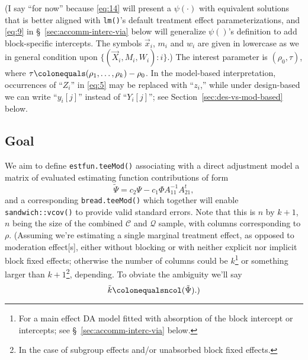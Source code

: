 \documentclass{article}
\newcommand{\defeq}{\ensuremath{\colonequals}}
\begin{document}
(I say ``for now'' because \eqref{eq:14} will present a
$\psi(\cdot)$ with equivalent solutions that is better aligned with
\texttt{lm()}'s default treatment effect parameterizations, and
\eqref{eq:9} in \S~\ref{sec:accomm-interc-via} below will generalize $\psi()$'s definition
to add block-specific intercepts.  The symbols $\vec{x}_{i}$, $m_{i}$
and $w_{i}$ are given in lowercase as we in general condition upon
$\{(\vec{X}_{i}, M_{i}, W_{i}): i\}$.)
The interest parameter is $(\rho_{0}, \tau)$, where $\tau \defeq (\rho_{1}, \ldots, \rho_{k}) - \rho_{0}$. In the model-based interpretation, occurrences of ``$Z_{i}$'' in \eqref{eq:5} may be replaced with ``$z_{i}$,'' while under design-based we can write ``$y_{i}[j]$'' instead of ``$Y_{i}[j]$''; see Section~\ref{sec:des-vs-mod-based} below.

\subsection{Goal} \label{sec:goal}
We aim to define \texttt{estfun.teeMod()} associating
with a direct adjustment model a matrix of evaluated estimating function
contributions of form
\begin{equation} \label{eq:22}
  \tilde{\Psi} = c_{2}\Psi - c_{1}\Phi A_{11}^{-1}A_{21}^{t},
\end{equation}
and a corresponding \texttt{bread.teeMod()} which together will enable \texttt{sandwich::vcov()} to provide valid standard errors.
Note that this is $n$ by
$k+1$, $n$ being the size of the combined $\mathcal{C}$ and
$\mathcal{Q}$ sample, with columns corresponding to $\rho$.%
(Assuming we're estimating a single marginal treatment effect, as
opposed to moderation effect[s], either without blocking or with
neither explicit nor implicit block fixed effects; otherwise the
number of columns could be $k$\footnote{For a main effect
DA model fitted with absorption of the block intercept or
intercepts; see \S~\ref{sec:accomm-interc-via} below.} or something
larger than $k+1$\footnote{In the case of subgroup effects and/or unabsorbed block fixed effects.},
depending. To obviate the ambiguity we'll say
\begin{equation*}
  \tilde{k} \defeq \mathtt{ncol}(\tilde{\Psi}).)
\end{equation*}
\end{document}
